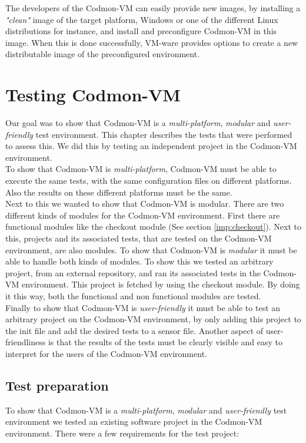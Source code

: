 \documentclass{article}
\newcommand{\project}{Codmon-VM}
\begin{document}
\noindent The developers of the \project{} can easily provide new images, by installing a \emph{"clean"} image of the target platform, Windows or one of the different Linux distributions for instance, and 
install and preconfigure \project{} in this image. When this is done successfully, VM-ware provides options to create a new distributable image of the preconfigured environment. 

\newpage
\section{Testing \project{}}
\label{test}
Our goal was to show that \project{} is a \emph{multi-platform}, \emph{modular} and \emph{user-friendly} test environment. This chapter describes the tests that were performed to assess this. We did this 
by testing an independent project in the \project{} environment.\\

\noindent To show that \project{} is \emph{multi-platform}, \project{} must be able to execute the same tests, with the same configuration files on different platforms. Also the results on these different 
platforms must be the same.\\


\noindent Next to this we wanted to show that \project{} is modular. There are two different kinds of modules for the \project{} environment. First there are functional modules like the checkout module (See 
section \ref{imp:checkout}). Next to this, projects and its associated tests, that are tested on the \project{} environment, are also modules. To show that \project{} is \emph{modular} it must be able to 
handle both kinds of modules. To show this we tested an arbitrary project, from an external repository, and ran its associated tests in the \project{} environment. This project is fetched by using the 
checkout module. By doing it this way, both the functional and non functional modules are tested.\\

\noindent Finally to show that \project{} is \emph{user-friendly} it must be able to test an arbitrary project on the \project{} environment, by only adding this project to the init file and add the desired 
tests to a sensor file. Another aspect of user-friendliness is that the results of the tests must be clearly visible and easy to interpret for the users of the \project{} environment.

\subsection{Test preparation}
\label{test:prep}
To show that \project{} is a \emph{multi-platform}, \emph{modular} and \emph{user-friendly} test environment we tested an existing software project in the \project{} environment. There were a few 
requirements for the test project:
\end{document}
